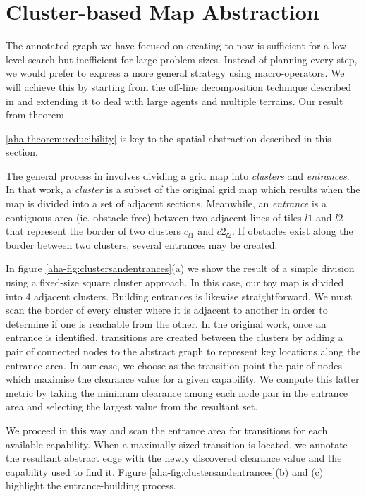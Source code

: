 \section{Cluster-based Map Abstraction}
\label{aha:mapabstraction}
The annotated graph we have focused on creating to now is sufficient for a low-level search but inefficient for large problem sizes. 
Instead of planning every step, we would prefer to express a more general strategy using macro-operators.
We will achieve this by starting from the off-line decomposition technique described in \cite{botea04} and extending it to deal with large agents and multiple terrains. 
Our result from theorem {\ref{aha-theorem:reducibility} is key to the spatial abstraction described in this section. 
\par \indent
The general process in \cite{botea04} involves dividing a grid map into \emph{clusters} and \emph{entrances}. 
In that work, a \emph{cluster} is a subset of the original grid map which results when the map is divided into a set of adjacent sections. Meanwhile, an \emph{entrance} is a contiguous area (ie. obstacle free) between two adjacent lines of tiles $l1$ and $l2$ that represent the border of two clusters $c_{l1}$ and $c2_{l2}$. 
If obstacles exist along the border between two clusters, several entrances may be created.
\par \indent
In figure \ref{aha-fig:clustersandentrances}(a) we show the result of a simple division using a fixed-size square cluster approach. In this case, our toy map is divided into 4 adjacent clusters. 
Building entrances is likewise straightforward. 
We must scan the border of every cluster where it is adjacent to another in order to determine if one is reachable from the other. 
In the original work, once an entrance is identified, transitions are created between the clusters by adding a pair of connected nodes to the abstract graph to represent key locations along the entrance area. 
In our case, we choose as the transition point the pair of nodes which maximise the clearance value for a given capability. 
We compute this latter metric by taking the minimum clearance among each node pair in the entrance area and selecting the largest value from the resultant set. 
\par \indent
We proceed in this way and scan the entrance area for transitions for each available capability. 
When a maximally sized transition is located, we annotate the resultant abstract edge with the newly discovered clearance value and the capability used to find it.
Figure \ref{aha-fig:clustersandentrances}(b) and (c) highlight the entrance-building process. 
}
